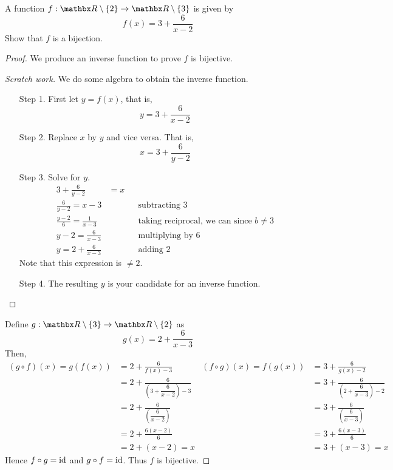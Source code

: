 \begin{example}
A function $f: \rr\setminus\set{2} \to \rr\setminus\set{3}$ is given by 
\[f(x) = 3 + \frac{6}{x - 2}\]
Show that $f$ is a bijection.
\end{example}
\begin{proof}
We produce an inverse function to prove $f$ is bijective.\\
\begin{subproof}
\begin{proof}[Scratch work]\renewcommand{\qed}{}
We do some algebra to obtain the inverse function. 
\begin{itemize}[leftmargin=3.5em]
\item[Step 1.] First let $y = f(x)$, that is,
\[y = 3 + \frac{6}{x - 2}\]
\item[Step 2.] Replace $x$ by $y$ and vice versa. That is,
\[x = 3 + \frac{6}{y - 2}\]
\item[Step 3.] Solve for $y$.
\begin{align*}
3 + \frac{6}{y - 2} &= x\\[0.5em]
\frac{6}{y - 2} = x - 3 &&& \text{subtracting $3$}\\[0.5em]
\frac{y - 2}{6} = \frac{1}{x - 3} &&& \text{taking reciprocal, we can since $b \neq 3$}\\[0.5em]
y - 2 = \frac{6}{x - 3} &&& \text{multiplying by $6$}\\[0.5em]
y = 2 + \frac{6}{x - 3} &&& \text{adding $2$}
\end{align*}
Note that this expression is $\neq 2$.
\item[Step 4.] The resulting $y$ is your candidate for an inverse function.
\end{itemize}
\end{proof}
\end{subproof}
\vspace*{0.5em}
Define $g: \rr\setminus\set{3} \to \rr\setminus\set{2}$ as
\[g(x) = 2 + \frac{6}{x - 3}\]
Then,
\begin{align*}
(g\circ f)(x) = g(f(x)) &= 2 + \frac{6}{f(x) - 3} & (f\circ g)(x) = f(g(x)) &= 3 + \frac{6}{g(x) - 2}\\[1em]
 &= 2 + \frac{6}{\left(3 + \dfrac{6}{x - 2}\right) - 3} & &= 3 + \frac{6}{\left(2 + \dfrac{6}{x - 3}\right) - 2}\\[1em]
 &= 2 + \frac{6}{\left(\dfrac{6}{x - 2}\right)} & &= 3 + \frac{6}{\left(\dfrac{6}{x - 3}\right)}\\[1em]
 &= 2 + \frac{6(x-2)}{6} & &= 3 + \frac{6(x-3)}{6}\\[1em]
 &= 2 + (x - 2) = x & &= 3 + (x - 3)  = x
\end{align*}
Hence $f\circ g = \operatorname{id}$ and $g\circ f = \operatorname{id}$. Thus $f$ is bijective.
\end{proof}

